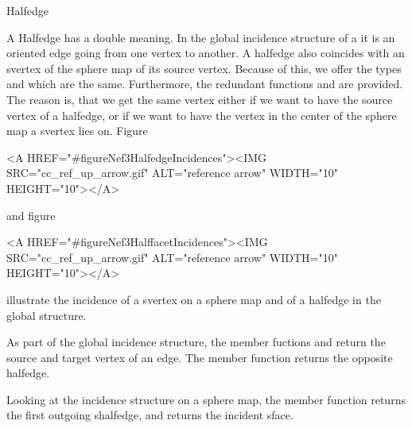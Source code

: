 
\ccRefPageBegin



\begin{ccRefClass}{Halfedge}

\ccDefinition
 
A Halfedge has a double meaning. In the global incidence structure of a
 it is an oriented edge going from one vertex to another.
A halfedge also coincides with an svertex of the sphere map of its source 
vertex. Because of this, we offer the types  and 
which are the same. Furthermore, the redundant functions 
and  are provided. The reason is, that we get the same vertex
either if we want to have the source vertex of a halfedge, or if we want to 
have the vertex in the center of the sphere map a svertex lies on. 
Figure~\begin{ccHtmlOnly}
  <A HREF="#figureNef3HalfedgeIncidences"><IMG 
  SRC="cc_ref_up_arrow.gif" ALT="reference arrow" WIDTH="10" HEIGHT="10"></A>
\end{ccHtmlOnly} and
figure~\begin{ccHtmlOnly}
  <A HREF="#figureNef3HalffacetIncidences"><IMG 
  SRC="cc_ref_up_arrow.gif" ALT="reference arrow" WIDTH="10" HEIGHT="10"></A>
\end{ccHtmlOnly} illustrate the incidence of a svertex on a sphere map and of
a halfedge in the global structure. 

As part of the global incidence structure, the member fuctions  
and  return the source and target vertex of an edge. The member
function  returns the opposite halfedge.

Looking at the incidence structure on a sphere map, the member function 
 returns the first outgoing shalfedge, and 
returns the incident sface.


\end{ccRefClass}
